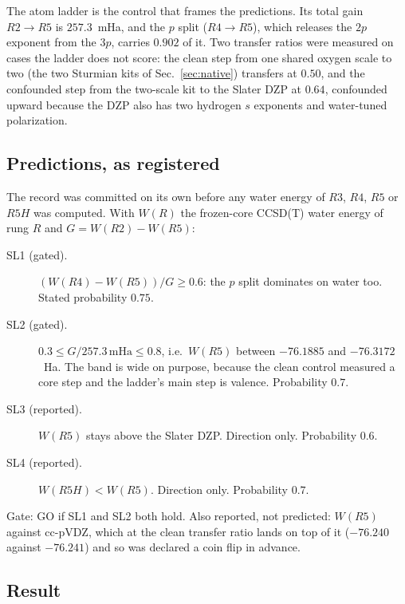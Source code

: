 \documentclass[aps,pra,twocolumn,superscriptaddress,longbibliography]{revtex4-2}
\newcommand{\mHa}{\,\mathrm{mHa}}
\begin{document}
The atom ladder is the control that frames the predictions.  Its total
gain $R2\to R5$ is $257.3$~mHa, and the $p$ split ($R4\to R5$), which
releases the $2p$ exponent from the $3p$, carries $0.902$ of it.  Two
transfer ratios were measured on cases the ladder does not score: the
clean step from one shared oxygen scale to two (the two Sturmian kits of
Sec.~\ref{sec:native}) transfers at $0.50$, and the confounded step from
the two-scale kit to the Slater DZP at $0.64$, confounded upward because
the DZP also has two hydrogen $s$ exponents and water-tuned
polarization.

\subsection{Predictions, as registered}

The record \cite{sl_record} was committed on its own before any water
energy of $R3$, $R4$, $R5$ or $R5H$ was computed.  With $W(R)$ the
frozen-core CCSD(T) water energy of rung $R$ and $G=W(R2)-W(R5)$:
\begin{description}
\item[SL1 (gated).]  $(W(R4)-W(R5))/G\ge0.6$: the $p$ split dominates
on water too.  Stated probability $0.75$.
\item[SL2 (gated).]  $0.3\le G/257.3\mHa\le0.8$, i.e.\ $W(R5)$ between
$-76.1885$ and $-76.3172$~Ha.  The band is wide on purpose, because the
clean control measured a core step and the ladder's main step is
valence.  Probability $0.7$.
\item[SL3 (reported).]  $W(R5)$ stays above the Slater DZP.  Direction
only.  Probability $0.6$.
\item[SL4 (reported).]  $W(R5H)<W(R5)$.  Direction only.  Probability
$0.7$.
\end{description}
Gate: GO if SL1 and SL2 both hold.  Also reported, not predicted:
$W(R5)$ against cc-pVDZ, which at the clean transfer ratio lands on top
of it ($-76.240$ against $-76.241$) and so was declared a coin flip in
advance.

\subsection{Result}
\end{document}
